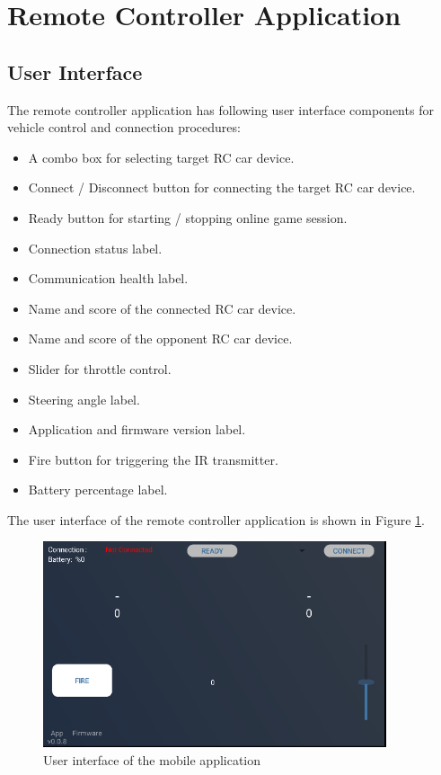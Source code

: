 \section{Remote Controller Application} \label{sec_remote_app}

\subsection{User Interface} \label{sec_user_interface}
The remote controller application has following user interface components for vehicle control and connection procedures:

\begin{itemize}
    \item A combo box for selecting target RC car device.
    \item Connect / Disconnect button for connecting the target RC car device.
    \item Ready button for starting / stopping online game session.
    \item Connection status label.
    \item Communication health label.
    \item Name and score of the connected RC car device.
    \item Name and score of the opponent RC car device.
    \item Slider for throttle control.
    \item Steering angle label.
    \item Application and firmware version label.
    \item Fire button for triggering the IR transmitter.
    \item Battery percentage label.
\end{itemize}

The user interface of the remote controller application is shown in Figure \ref{fig:ui_app}.

\begin{figure}[!htbp]
    \centering
\includegraphics[width=0.9\textwidth]{Imgs/ui_app.png}
    \caption{\label{fig:ui_app}User interface of the mobile application}
\end{figure}


